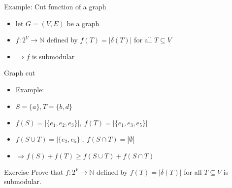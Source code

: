 \documentclass[usenames,dvipsnames]{beamer}
\newcommand{\N}{\mathbb{N}}
\begin{document}
\begin{frame}{Example: Cut function of a graph}
  \begin{itemize}
  \item let $G = (V,E)$ be a graph
  \item $f: 2^V \rightarrow \N$ defined by $f(T) = |\delta(T)|$ for
    all $T \subseteq V$ 
  \item $\Rightarrow f$ is submodular
  \end{itemize}
\end{frame}

  \begin{frame}{Graph cut}
    \begin{center}
    \end{center}
    \begin{itemize}
    \item[] Example: 
    \item $S = \{a\}, T = \{b,d\}$
    \item $f(S) = |\{e_1, e_2, e_3\}|,~f(T) = |\{e_1, e_3, e_5\}|$
    \item $f(S \cup T) = |\{e_2, e_5\}|,~f(S \cap T) = |\emptyset|$
    \item $\Rightarrow f(S) + f(T) \geq f(S \cup T) + f(S \cap T)$
    \end{itemize}
\end{frame}

  \begin{frame}{Exercise}
    Prove that $f: 2^V \rightarrow \N$ defined by $f(T) = |\delta(T)|$
    for all $T \subseteq V$ is submodular.
  \end{frame}

\end{document}
